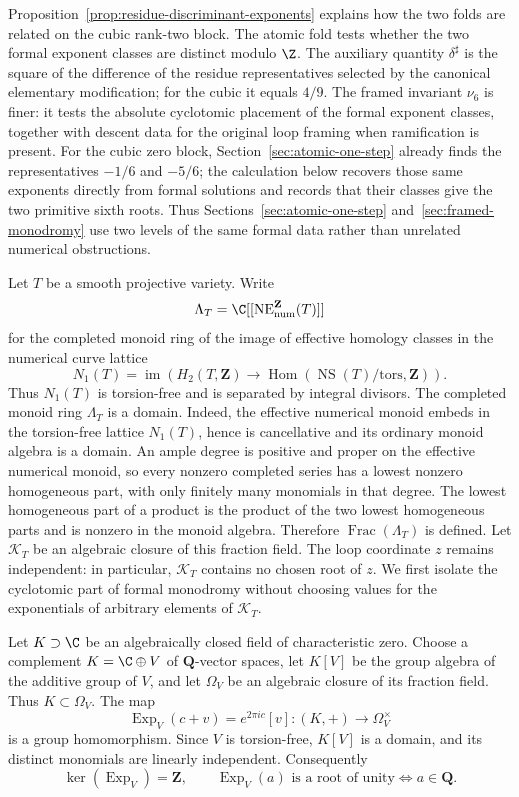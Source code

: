 Proposition~\ref{prop:residue-discriminant-exponents} explains how the two
folds are related on the cubic rank-two block.  The atomic fold tests whether
the two formal exponent classes are distinct modulo \(\Z\).  The auxiliary
quantity \(\delta^\sharp\) is the square of the difference of the residue
representatives selected by the canonical elementary modification; for the
cubic it equals \(4/9\).  The
framed invariant \(\nu_6\) is finer: it tests the absolute cyclotomic
placement of the formal exponent classes, together with descent data for the
original loop framing when ramification is present.  For the cubic zero
block, Section~\ref{sec:atomic-one-step} already finds the representatives
\(-1/6\) and \(-5/6\); the calculation below
recovers those same exponents directly from formal solutions and records
that their classes give the two primitive sixth roots.  Thus
Sections~\ref{sec:atomic-one-step} and~\ref{sec:framed-monodromy} use two
levels of the same formal data rather than unrelated numerical obstructions.

Let \(T\) be a smooth projective variety.  Write
\[
 \Lambda_T=\C[[\operatorname{NE}^{\mathbf Z}_{\rm num}(T)]]
\]
for the completed monoid ring of the image of effective homology classes in
the numerical curve lattice
\[
 N_1(T)=\operatorname{im}\!\left(
 H_2(T,\mathbf Z)\longrightarrow
 \operatorname{Hom}(\operatorname{NS}(T)/\mathrm{tors},\mathbf Z)\right).
\]
Thus \(N_1(T)\) is torsion-free and is separated by integral divisors.  The
completed monoid ring \(\Lambda_T\) is a domain.  Indeed, the effective
numerical monoid embeds in the torsion-free lattice \(N_1(T)\), hence is
cancellative and its ordinary monoid algebra is a domain.  An ample degree
is positive and proper on the effective numerical monoid, so every nonzero
completed series has a lowest nonzero homogeneous part, with only finitely
many monomials in that degree.  The lowest homogeneous part of a product is
the product of the two lowest homogeneous parts and is nonzero in the monoid
algebra.  Therefore \(\operatorname{Frac}(\Lambda_T)\) is defined.  Let
\(\mathcal K_T\) be an algebraic closure of this fraction field.  The loop
coordinate \(z\) remains independent: in particular, \(\mathcal K_T\)
contains no chosen root of \(z\).  We first isolate the cyclotomic part of
formal monodromy without choosing values for the exponentials of arbitrary
elements of \(\mathcal K_T\).

Let \(K\supset\C\) be an algebraically closed field of characteristic zero.
Choose a complement \(K=\C\oplus V\) of \(\mathbf Q\)-vector spaces, let
\(K[V]\) be the group algebra of the additive group of \(V\), and let
\(\Omega_V\) be an algebraic closure of its fraction field.  Thus
\(K\subset\Omega_V\).  The map
\[
 \operatorname{Exp}_V(c+v)=e^{2\pi i c}[v]
 \colon (K,+)\longrightarrow\Omega_V^\times
 \label{eq:universal-exponential}
\]
is a group homomorphism.  Since \(V\) is torsion-free, \(K[V]\) is a domain,
and its distinct monomials are linearly independent.  Consequently
\[
 \ker(\operatorname{Exp}_V)=\mathbf Z,
 \qquad
 \operatorname{Exp}_V(a)\text{ is a root of unity}
 \Longleftrightarrow a\in\mathbf Q.
 \label{eq:universal-exponential-torsion}
\]

